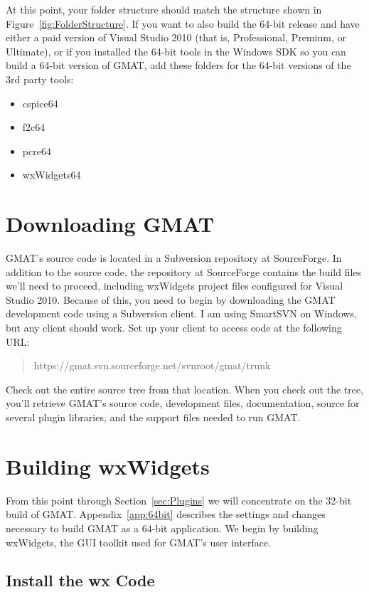 \documentclass[letterpaper,10pt]{article}%
\begin{document}
\noindent At this point, your folder structure should match the structure shown in Figure~\ref{fig:FolderStructure}.  If you want to also build the 64-bit release and have either a paid version of Visual Studio 2010 (that is, Professional, Premium, or Ultimate), or if you installed the 64-bit tools in the Windows SDK so you can build a 64-bit version of GMAT, add these folders for the 64-bit versions of the 3rd party tools:
\begin{itemize}
\item cspice64
\item f2c64
\item pcre64
\item wxWidgets64
\end{itemize}

\section{Downloading GMAT}

GMAT's source code is located in a Subversion repository at SourceForge.  In addition to the source code, the repository at SourceForge contains the build files we'll need to proceed, including wxWidgets project files configured for Visual Studio 2010.  Because of this, you need to begin by downloading the GMAT development code using a Subversion client.  I am using SmartSVN on Windows, but any client should work.  Set up your client to access code at the following URL:

\begin{quote}
https://gmat.svn.sourceforge.net/svnroot/gmat/trunk
\end{quote}
\noindent Check out the entire source tree from that location.  When you check out the tree, you'll retrieve GMAT's source code, development files, documentation, source for several plugin libraries, and the support files needed to run GMAT. 

\section{Building wxWidgets}

From this point through Section~\ref{sec:Plugins} we will concentrate on the 32-bit build of GMAT.  Appendix~\ref{app:64bit} describes the settings and changes necessary to build GMAT as a 64-bit application.  We begin by building wxWidgets, the GUI toolkit used for GMAT's user interface.

\subsection{Install the wx Code}
\end{document}
